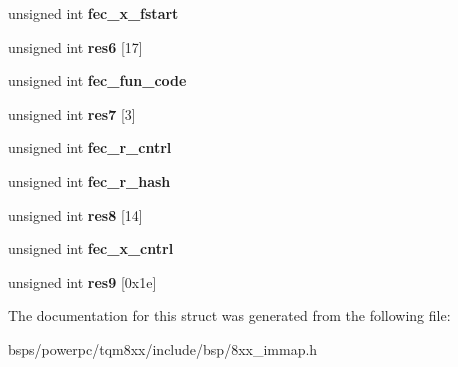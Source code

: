 \begin{DoxyCompactItemize}
\mbox{\label{structfec_a6eaf70355cea74d292ed3c85966cc5df}} 
unsigned int {\bfseries fec\+\_\+x\+\_\+fstart}
\item 
\mbox{\label{structfec_adfc16177893fd754f22582a8e14b627b}} 
unsigned int {\bfseries res6} \mbox{[}17\mbox{]}
\item 
\mbox{\label{structfec_af6bba4d3702e6794a1242ac63e951f03}} 
unsigned int {\bfseries fec\+\_\+fun\+\_\+code}
\item 
\mbox{\label{structfec_a38043b3d72774cd93d9b82edfb658975}} 
unsigned int {\bfseries res7} \mbox{[}3\mbox{]}
\item 
\mbox{\label{structfec_a6116117bd1ed77ef72d873fc42ebb780}} 
unsigned int {\bfseries fec\+\_\+r\+\_\+cntrl}
\item 
\mbox{\label{structfec_a6d98f92bb386546b182c8edad1ef025b}} 
unsigned int {\bfseries fec\+\_\+r\+\_\+hash}
\item 
\mbox{\label{structfec_a73c44cd73edc860546443ec33de57758}} 
unsigned int {\bfseries res8} \mbox{[}14\mbox{]}
\item 
\mbox{\label{structfec_ac2489005baa9c9a04a6244f6de22067f}} 
unsigned int {\bfseries fec\+\_\+x\+\_\+cntrl}
\item 
\mbox{\label{structfec_a3e9e58e9512f59d070b4f5043ee26485}} 
unsigned int {\bfseries res9} \mbox{[}0x1e\mbox{]}
\end{DoxyCompactItemize}


The documentation for this struct was generated from the following file\+:\begin{DoxyCompactItemize}
\item 
bsps/powerpc/tqm8xx/include/bsp/8xx\+\_\+immap.\+h\end{DoxyCompactItemize}
